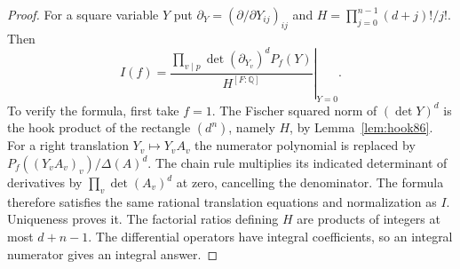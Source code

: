 \documentclass[a4paper,11pt]{article}
\theoremstyle{definition}
\theoremstyle{remark}
\numberwithin{equation}{section}
\begin{document}
\begin{proof}
For a square variable \(Y\) put \(\partial_Y=(\partial/\partial
Y_{ij})_{ij}\) and \(H=\prod_{j=0}^{n-1}(d+j)!/j!\). Then
\[
 I(f)=
 \left.\frac{\displaystyle\prod_{v\mid p}
              \det(\partial_{Y_v})^d P_f(Y)}
             {H^{[F:\mathbb Q]}}\right|_{Y=0}.
\]
To verify the formula, first take \(f=1\). The Fischer squared
norm of \((\det Y)^d\) is the hook product of the rectangle
\((d^n)\), namely \(H\), by Lemma~\ref{lem:hook86}.
For a right translation \(Y_v\mapsto Y_v A_v\) the numerator
polynomial is replaced by \(P_f((Y_v A_v)_v)/\Delta(A)^d\).
The chain rule multiplies its indicated determinant of derivatives
by \(\prod_v\det(A_v)^d\) at zero, cancelling the denominator.
The formula therefore satisfies the same rational translation
equations and normalization as \(I\). Uniqueness proves it.
The factorial ratios defining \(H\) are products of integers
at most \(d+n-1\). The differential operators have integral
coefficients, so an integral numerator gives an integral answer.
\end{proof}
\end{document}
